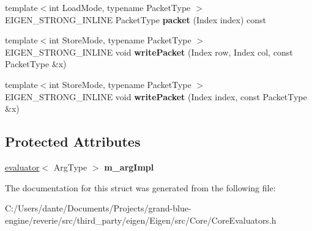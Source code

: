 \begin{DoxyCompactItemize}
\item 
\mbox{\label{struct_eigen_1_1internal_1_1evaluator__wrapper__base_a1d5c0ece1d9beb02a6e3cf3cbff39220}} 
{\footnotesize template$<$int Load\+Mode, typename Packet\+Type $>$ }\\E\+I\+G\+E\+N\+\_\+\+S\+T\+R\+O\+N\+G\+\_\+\+I\+N\+L\+I\+NE Packet\+Type {\bfseries packet} (Index index) const
\item 
\mbox{\label{struct_eigen_1_1internal_1_1evaluator__wrapper__base_a05c007daf5b8cc64e2c962c6ddb1b9be}} 
{\footnotesize template$<$int Store\+Mode, typename Packet\+Type $>$ }\\E\+I\+G\+E\+N\+\_\+\+S\+T\+R\+O\+N\+G\+\_\+\+I\+N\+L\+I\+NE void {\bfseries write\+Packet} (Index row, Index col, const Packet\+Type \&x)
\item 
\mbox{\label{struct_eigen_1_1internal_1_1evaluator__wrapper__base_a1adee3ca0efc3280603884dda77bd012}} 
{\footnotesize template$<$int Store\+Mode, typename Packet\+Type $>$ }\\E\+I\+G\+E\+N\+\_\+\+S\+T\+R\+O\+N\+G\+\_\+\+I\+N\+L\+I\+NE void {\bfseries write\+Packet} (Index index, const Packet\+Type \&x)
\end{DoxyCompactItemize}
\subsection*{Protected Attributes}
\begin{DoxyCompactItemize}
\item 
\mbox{\label{struct_eigen_1_1internal_1_1evaluator__wrapper__base_a99bf3690d536cd7da7bdf1cce4ec7baf}} 
\mbox{\hyperlink{struct_eigen_1_1internal_1_1evaluator}{evaluator}}$<$ Arg\+Type $>$ {\bfseries m\+\_\+arg\+Impl}
\end{DoxyCompactItemize}


The documentation for this struct was generated from the following file\+:\begin{DoxyCompactItemize}
\item 
C\+:/\+Users/dante/\+Documents/\+Projects/grand-\/blue-\/engine/reverie/src/third\+\_\+party/eigen/\+Eigen/src/\+Core/Core\+Evaluators.\+h\end{DoxyCompactItemize}
